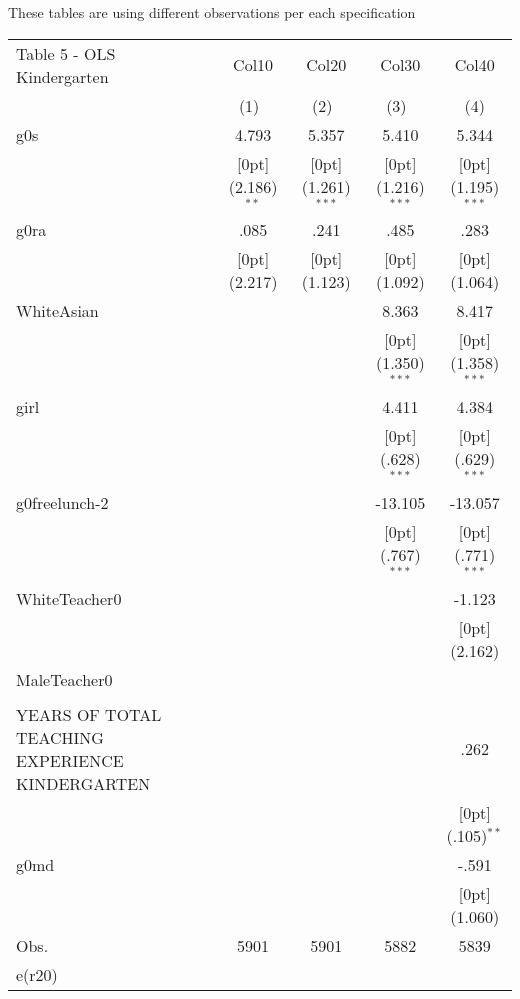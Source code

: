 \documentclass[a4paper,11pt]{article}
\begin{document}
\setlength\tabcolsep{1.75pt} 

These tables are using different observations per each specification

\begin{table}
\small
\begin{tabular*}{\textwidth}{@{\extracolsep{\fill}}lcccc}				
Table 5 - OLS Kindergarten & \multicolumn{1}{c}{Col10} &	\multicolumn{1}{c}{Col20} &	\multicolumn{1}{c}{Col30} &	\multicolumn{1}{c}{Col40} \\
\cline{2-5}				
& \multicolumn{1}{c}{(1)\mbox{\ }} &	\multicolumn{1}{c}{(2)\mbox{\ }} &	\multicolumn{1}{c}{(3)\mbox{\ }} &	\multicolumn{1}{c}{(4)} \\
\hline				
g0s &	4.793 &	5.357 &	5.410 &	5.344 \\
&	\raisebox{.7ex}[0pt]{\scriptsize (2.186)$^{**}$} &	\raisebox{.7ex}[0pt]{\scriptsize (1.261)$^{***}$} &	\raisebox{.7ex}[0pt]{\scriptsize (1.216)$^{***}$} &	\raisebox{.7ex}[0pt]{\scriptsize (1.195)$^{***}$} \\
g0ra &	.085 &	.241 &	.485 &	.283 \\
&	\raisebox{.7ex}[0pt]{\scriptsize (2.217)} &	\raisebox{.7ex}[0pt]{\scriptsize (1.123)} &	\raisebox{.7ex}[0pt]{\scriptsize (1.092)} &	\raisebox{.7ex}[0pt]{\scriptsize (1.064)} \\
WhiteAsian &	&	&	8.363 &	8.417 \\
&	&	&	\raisebox{.7ex}[0pt]{\scriptsize (1.350)$^{***}$} &	\raisebox{.7ex}[0pt]{\scriptsize (1.358)$^{***}$} \\
girl &	&	&	4.411 &	4.384 \\
&	&	&	\raisebox{.7ex}[0pt]{\scriptsize (.628)$^{***}$} &	\raisebox{.7ex}[0pt]{\scriptsize (.629)$^{***}$} \\
g0freelunch-2 &	&	&	-13.105 &	-13.057 \\
&	&	&	\raisebox{.7ex}[0pt]{\scriptsize (.767)$^{***}$} &	\raisebox{.7ex}[0pt]{\scriptsize (.771)$^{***}$} \\
WhiteTeacher0 &	&	&	&	-1.123 \\
&	&	&	&	\raisebox{.7ex}[0pt]{\scriptsize (2.162)} \\
MaleTeacher0 &	&	&	&	\\
&	&	&	&	\\
YEARS OF TOTAL TEACHING EXPERIENCE KINDERGARTEN &	&	&	&	.262 \\
&	&	&	&	\raisebox{.7ex}[0pt]{\scriptsize (.105)$^{**}$} \\
g0md &	&	&	&	-.591 \\
&	&	&	&	\raisebox{.7ex}[0pt]{\scriptsize (1.060)} \\
Obs. &	5901 &	5901 &	5882 &	5839 \\
e(r20) &	&	&	&	\\
\hline\hline				
\end{tabular*}
\end{table}	
\end{document}
